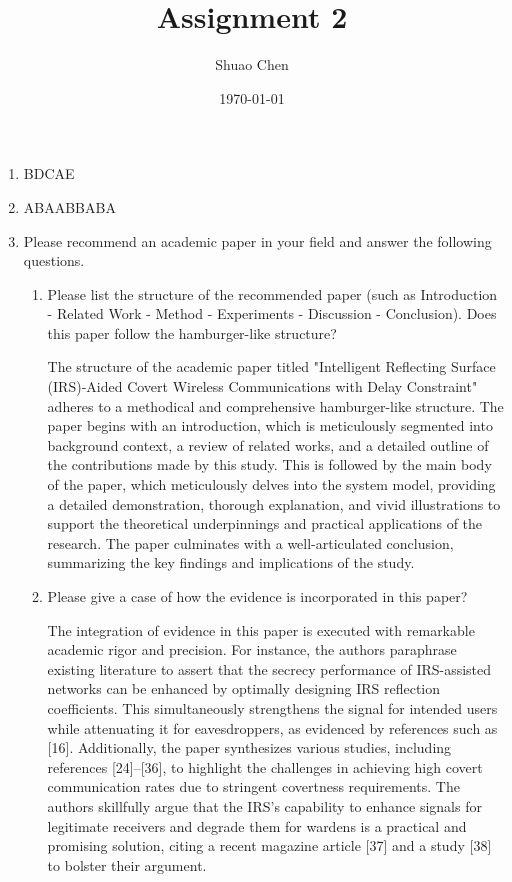 \documentclass[12pt]{article}
\title{Assignment 2}
\author{Shuao Chen}
\date{\today}
\begin{document}
\maketitle
\begin{enumerate}
    \item BDCAE

    \item ABAABBABA

    \item Please recommend an academic paper in your field and answer the following questions.
    
    \begin{enumerate}
        \item Please list the structure of the recommended paper (such as Introduction - Related Work - Method - Experiments - Discussion - Conclusion). Does this paper follow the hamburger-like structure?
        
           The structure of the academic paper titled "Intelligent Reflecting Surface (IRS)-Aided Covert Wireless Communications with Delay Constraint" adheres to a methodical and comprehensive hamburger-like structure. The paper begins with an introduction, which is meticulously segmented into background context, a review of related works, and a detailed outline of the contributions made by this study. This is followed by the main body of the paper, which meticulously delves into the system model, providing a detailed demonstration, thorough explanation, and vivid illustrations to support the theoretical underpinnings and practical applications of the research. The paper culminates with a well-articulated conclusion, summarizing the key findings and implications of the study.
        
        \item Please give a case of how the evidence is incorporated in this paper?
        
           The integration of evidence in this paper is executed with remarkable academic rigor and precision. For instance, the authors paraphrase existing literature to assert that the secrecy performance of IRS-assisted networks can be enhanced by optimally designing IRS reflection coefficients. This simultaneously strengthens the signal for intended users while attenuating it for eavesdroppers, as evidenced by references such as [16]. Additionally, the paper synthesizes various studies, including references [24]–[36], to highlight the challenges in achieving high covert communication rates due to stringent covertness requirements. The authors skillfully argue that the IRS's capability to enhance signals for legitimate receivers and degrade them for wardens is a practical and promising solution, citing a recent magazine article [37] and a study [38] to bolster their argument.
        

\end{enumerate}
\end{enumerate}
\end{document}
